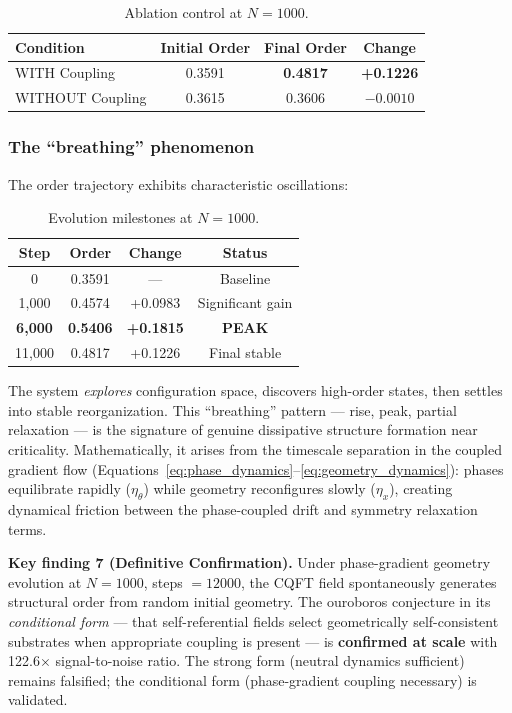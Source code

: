 \documentclass[12pt,a4paper]{article}
\theoremstyle{plain}
\theoremstyle{definition}
\begin{document}
\begin{table}[H]
\centering
\caption{Ablation control at $N=1000$.}
\label{tab:ablation1000}
\begin{tabular}{lccc}
\toprule
\textbf{Condition} & \textbf{Initial Order} & \textbf{Final Order} & \textbf{Change} \\
\midrule
WITH Coupling & 0.3591 & \textbf{0.4817} & \textbf{+0.1226} \\
WITHOUT Coupling & 0.3615 & 0.3606 & $-0.0010$ \\
\bottomrule
\end{tabular}
\end{table}

\subsubsection{The ``breathing'' phenomenon}

The order trajectory exhibits characteristic oscillations:

\begin{table}[H]
\centering
\caption{Evolution milestones at $N=1000$.}
\label{tab:milestones}
\begin{tabular}{cccc}
\toprule
\textbf{Step} & \textbf{Order} & \textbf{Change} & \textbf{Status} \\
\midrule
0 & 0.3591 & --- & Baseline \\
1,000 & 0.4574 & +0.0983 & Significant gain \\
\textbf{6,000} & \textbf{0.5406} & \textbf{+0.1815} & \textbf{PEAK} \\
11,000 & 0.4817 & +0.1226 & Final stable \\
\bottomrule
\end{tabular}
\end{table}

The system \emph{explores} configuration space, discovers high-order states, then
settles into stable reorganization. This ``breathing'' pattern --- rise, peak,
partial relaxation --- is the signature of genuine dissipative structure formation
near criticality. Mathematically, it arises from the timescale separation in the
coupled gradient flow (Equations~\ref{eq:phase_dynamics}--\ref{eq:geometry_dynamics}):
phases equilibrate rapidly ($\eta_\theta$) while geometry reconfigures slowly
($\eta_x$), creating dynamical friction between the phase-coupled drift and
symmetry relaxation terms.

\begin{keyresult}
\textbf{Key finding 7 (Definitive Confirmation).} Under phase-gradient geometry
evolution at $N = 1000$, steps $= 12000$, the CQFT field spontaneously generates
structural order from random initial geometry. The ouroboros conjecture in its
\emph{conditional form} --- that self-referential fields select geometrically
self-consistent substrates when appropriate coupling is present --- is \textbf{confirmed
at scale} with 122.6$\times$ signal-to-noise ratio. The strong form (neutral
dynamics sufficient) remains falsified; the conditional form (phase-gradient
coupling necessary) is validated.
\end{keyresult}
\end{document}
